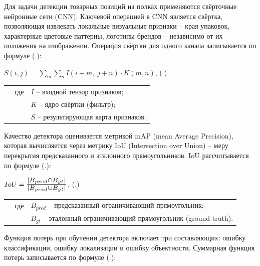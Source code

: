{  \par \redline Для задачи детекции товарных позиций на полках применяются свёрточные
  нейронные сети (CNN).
  Ключевой операцией в CNN является свёртка, позволяющая извлекать локальные
  визуальные признаки {--} края упаковок, характерные цветовые паттерны, логотипы
  брендов {--} независимо от их положения на изображении.
  Операция свёртки для одного канала записывается по формуле
  (\thechaptercntr .\theformulacntr):

  \formulaspace
  \par \redline $S(i, j) = \displaystyle\sum_{m}\sum_{n} I(i+m,\; j+n) \cdot K(m, n)$,
  \hfill (\thechaptercntr .\theformulacntr) \hspace*{-0.5cm}\redline
  \formulaspace \addtocounter{formulacntr}{1}

  \begin{tabular}{p{}p{}p{}}
    & где  & $I$ {--} входной тензор признаков; \\
    &      & $K$ {--} ядро свёртки (фильтр); \\
    &      & $S$ {--} результирующая карта признаков. \\
  \end{tabular}
  \vspace{13pt}
  
  \par \redline Качество детектора оценивается метрикой mAP (mean Average Precision),
  которая вычисляется через метрику IoU (Intersection over Union) {--} меру перекрытия
  предсказанного и эталонного прямоугольников.
  IoU рассчитывается по формуле (\thechaptercntr .\theformulacntr):

  \formulaspace
  \par \redline $IoU = \scaleto{\frac{\left|B_{pred} \cap B_{gt}\right|}{\left|B_{pred} \cup B_{gt}\right|}}{20pt}$,
  \hfill (\thechaptercntr .\theformulacntr) \hspace*{-0.5cm}\redline
  \formulaspace \addtocounter{formulacntr}{1}

  \begin{tabular}{p{}p{}p{}}
    & где  & $B_{pred}$ {--} предсказанный ограничивающий прямоугольник; \\
    &      & $B_{gt}$ {--} эталонный ограничивающий прямоугольник (ground truth). \\
  \end{tabular}
  \vspace{13pt}
  
  \par \redline Функция потерь при обучении детектора включает три составляющих:
  ошибку классификации, ошибку локализации и ошибку объектности.
  Суммарная функция потерь записывается по формуле
  (\thechaptercntr .\theformulacntr):

}
